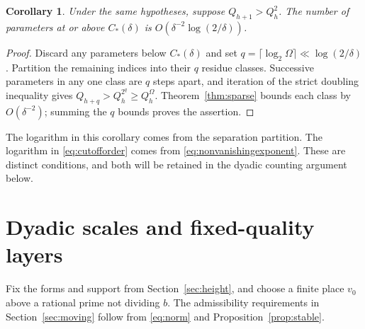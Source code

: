 \documentclass[11pt]{article}
\numberwithin{equation}{section}
\newtheorem{corollary}[theorem]{Corollary}
\theoremstyle{remark}\newtheorem{remark}[theorem]{Remark}
\begin{document}
\begin{corollary}\label{cor:count}
Under the same hypotheses, suppose $Q_{h+1}>Q_h^2$.
The number of parameters at or above $C_*(\delta)$ is
$O(\delta^{-2}\log(2/\delta))$.
\end{corollary}
\begin{proof}
Discard any parameters below $C_*(\delta)$ and set
$q=\lceil\log_2\Omega\rceil\ll\log(2/\delta)$.
Partition the remaining indices into their $q$ residue classes.
Successive parameters in any one class are $q$ steps apart, and
iteration of the strict doubling inequality gives
$Q_{h+q}>Q_h^{2^q}\ge Q_h^\Omega$.
Theorem~\ref{thm:sparse} bounds each class by $O(\delta^{-2})$;
summing the $q$ bounds proves the assertion.
\end{proof}

The logarithm in this corollary comes from the separation partition.
The logarithm in \eqref{eq:cutofforder} comes from
\eqref{eq:nonvanishingexponent}. These are distinct conditions, and
both will be retained in the dyadic counting argument below.

\section{Dyadic scales and fixed-quality layers}\label{sec:layers}
Fix the forms and support from Section~\ref{sec:height}, and choose
a finite place $v_0$ above a rational prime not dividing $b$.
The admissibility requirements in Section~\ref{sec:moving} follow
from \eqref{eq:norm} and Proposition~\ref{prop:stable}.
\end{document}

